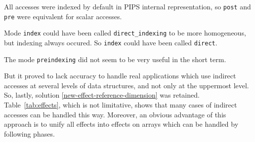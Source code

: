 \documentclass[a4paper]{report}
\begin{document}
All accesses were indexed by default in PIPS internal representation,
 so \verb/post/ and \verb/pre/ were equivalent for scalar accesses.

Mode \verb/index/ could have been called \verb/direct_indexing/ to be more
 homogeneous, but indexing always occured. So \verb/index/ could have been
 called \verb/direct/.

The mode \verb/preindexing/ did not seem to be very useful in the
 short term.


But it proved to lack accuracy to handle real applications which use indirect accesses at several levels of data structures, and not only at the uppermost level. So, lastly, solution \ref{new-effect-reference-dimension} was retained. Table~\ref{tab:effects}, which is not limitative, shows that many cases of indirect accesses can be handled this way. Moreover, an obvious advantage of this approach is to unify all effects into effects on arrays which can be handled by following phases. 
\end{document}
